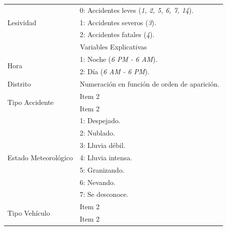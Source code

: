 \begin{enumerate}
\begin{enumerate}
\begin{table}[ht]
\begin{tabular}{ll}
                           \multirow{3}{*}{Lesividad}            & 0: Accidentes leves (\textit{1, 2, 5, 6, 7, 14}).\\
                                                                 & 1: Accidentes severos (\textit{3}).\\
                                                                 & 2: Accidentes fatales (\textit{4}).\\

                           \midrule
                           \midrule
                           \multicolumn{2}{c}{Variables Explicativas}\\
                           \midrule
                           \multirow{2}{*}{Hora}                 & 1: Noche (\textit{6 PM - 6 AM}).\\
                                                                 & 2: Día (\textit{6 AM - 6 PM}).\\
                           \midrule
                           \multirow{1}{*}{Distrito}             & Numeración en función de orden de aparición.\\
                           \midrule
                           \multirow{2}{*}{Tipo Accidente}       & Item 2\\
                                                                 & Item 2\\
                           \midrule
                           \multirow{7}{*}{Estado Meteorológico} & 1: Despejado.\\
                                                                 & 2: Nublado.\\
                                                                 & 3: Lluvia débil.\\
                                                                 & 4: Lluvia intensa.\\
                                                                 & 5: Granizando.\\
                                                                 & 6: Nevando.\\
                                                                 & 7: Se desconoce.\\
                           \midrule
                           \multirow{2}{*}{Tipo Vehículo}        & Item 2\\
                                                                 & Item 2\\

\end{tabular}
\end{table}
\end{enumerate}
\end{enumerate}
